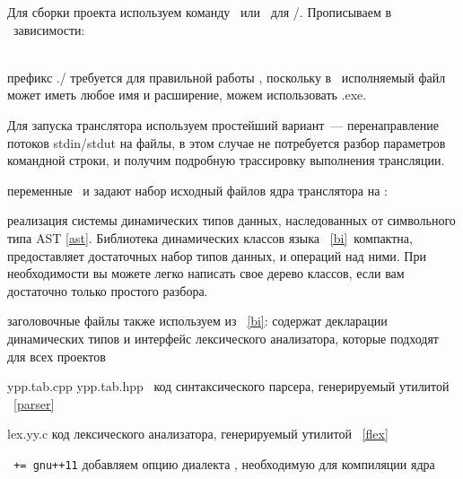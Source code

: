 
Для сборки проекта используем команду \ или \ для
\win/\mingw. Прописываем в \ зависимости:


\begin{description}

\item{}\\ префикс ./ требуется для правильной работы
, поскольку в \linux\ исполняемый файл может иметь любое имя и
расширение, можем использовать .exe.

Для запуска транслятора используем простейший вариант\ --- перенаправление
потоков stdin/stdut на файлы, в этом случае не потребуется разбор параметров
командной строки, и получим подробную трассировку выполнения трансляции.

\item{переменные \ и } задают набор исходный файлов ядра
транслятора на \cpp:

\begin{description}
\item{} реализация системы динамических типов данных,
наследованных от символьного типа AST \ref{ast}. Библиотека динамических классов
языка \bi\ \ref{bi}\ компактна, предоставляет достаточных набор типов
данных, и операций над ними. При необходимости вы можете легко написать свое
дерево классов, если вам достаточно только простого разбора.
\item{} заголовочные файлы также используем из \bi\ \ref{bi}:
содержат декларации динамических типов и интерфейс лексического анализатора,
которые подходят для всех проектов
\item{ypp.tab.cpp ypp.tab.hpp} \cpp\ код синтаксического парсера, генерируемый
утилитой \ \ref{parser}
\item{lex.yy.c} код лексического анализатора, генерируемый утилитой \
\ref{flex}
\item{\verb| += gnu++11|} добавляем опцию диалекта \cpp,
необходимую для компиляции ядра \bi
\end{description}

\end{description}
